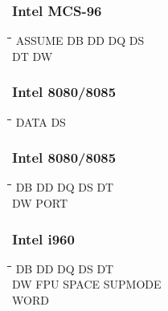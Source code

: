 \subsubsection{Intel MCS-96}
{\tt\begin{tabbing}
\hspace{3cm}\=\hspace{3cm}\=\hspace{3cm}\=\hspace{3cm}\=\kill
ASSUME     \> DB          \> DD          \> DQ          \> DS \\
DT         \> DW \\
\end{tabbing}}
 
\subsubsection{Intel 8080/8085} 
{\tt\begin{tabbing}
\hspace{3cm}\=\hspace{3cm}\=\hspace{3cm}\=\hspace{3cm}\=\kill
DATA       \> DS          \\
\end{tabbing}}

\subsubsection{Intel 8080/8085}
{\tt\begin{tabbing}
\hspace{3cm}\=\hspace{3cm}\=\hspace{3cm}\=\hspace{3cm}\=\kill
DB         \> DD          \> DQ          \> DS          \> DT \\
DW         \> PORT \\
\end{tabbing}}

\subsubsection{Intel i960}
{\tt\begin{tabbing}
\hspace{3cm}\=\hspace{3cm}\=\hspace{3cm}\=\hspace{3cm}\=\kill    
DB         \> DD          \> DQ          \> DS          \> DT \\
DW         \>             \> FPU         \> SPACE       \> SUPMODE \\
WORD \\
\end{tabbing}}

